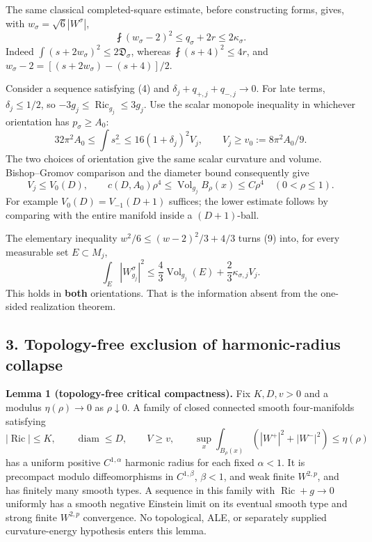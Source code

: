 \documentclass[
  11pt,
]{article}
\begin{document}
The same classical completed-square estimate, before constructing forms,
gives, with \(w_\sigma=\sqrt6|W^\sigma|\), \[
 \fint(w_\sigma-2)^2\le q_\sigma+2r\le2\kappa_\sigma.
 \tag{9}
\] Indeed \(\int(s+2w_\sigma)^2\le2\mathfrak D_\sigma\), whereas
\(\fint(s+4)^2\le4r\), and \(w_\sigma-2=[(s+2w_\sigma)-(s+4)]/2\).

Consider a sequence satisfying (4) and \(\delta_j+q_{+,j}+q_{-,j}\to0\).
For late terms, \(\delta_j\le1/2\), so
\(-3g_j\le\operatorname{Ric}_{g_j}\le3g_j\). Use the scalar monopole
inequality in whichever orientation has \(p_\sigma\ge A_0\): \[
 32\pi^2 A_0\le\int s_-^2
 \le16(1+\delta_j)^2V_j,
 \qquad V_j\ge v_0:=8\pi^2A_0/9.
 \tag{10}
\] The two choices of orientation give the same scalar curvature and
volume. Bishop--Gromov comparison and the diameter bound consequently
give \[
 V_j\le V_0(D),\qquad
 c(D,A_0)\rho^4\le\operatorname{Vol}_{g_j}B_\rho(x)
 \le C\rho^4\quad(0<\rho\le1).
 \tag{11}
\] For example \(V_0(D)=V_{-1}(D+1)\) suffices; the lower estimate
follows by comparing with the entire manifold inside a \((D+1)\)-ball.

The elementary inequality \(w^2/6\le (w-2)^2/3+4/3\) turns (9) into, for
every measurable set \(E\subset M_j\), \[
 \int_E|W^\sigma_{g_j}|^2
 \le\frac43\operatorname{Vol}_{g_j}(E)
       +\frac23\kappa_{\sigma,j}V_j.
 \tag{12}
\] This holds in \textbf{both} orientations. That is the information
absent from the one-sided realization theorem.

\hypertarget{topology-free-exclusion-of-harmonic-radius-collapse}{%
\subsection{3. Topology-free exclusion of harmonic-radius
collapse}\label{topology-free-exclusion-of-harmonic-radius-collapse}}

\textbf{Lemma 1 (topology-free critical compactness).} Fix \(K,D,v>0\)
and a modulus \(\eta(\rho)\to0\) as \(\rho\downarrow0\). A family of
closed connected smooth four-manifolds satisfying \[
 |\operatorname{Ric}|\le K,\qquad\operatorname{diam}\le D,
 \qquad V\ge v,\qquad
 \sup_x\int_{B_\rho(x)}(|W^+|^2+|W^-|^2)\le\eta(\rho)
 \tag{13a}
\] has a uniform positive \(C^{1,\alpha}\) harmonic radius for each
fixed \(\alpha<1\). It is precompact modulo diffeomorphisms in
\(C^{1,\beta}\), \(\beta<1\), and weak finite \(W^{2,p}\), and has
finitely many smooth types. A sequence in this family with
\(\operatorname{Ric}+g\to0\) uniformly has a smooth negative Einstein
limit on its eventual smooth type and strong finite \(W^{2,p}\)
convergence. No topological, ALE, or separately supplied
curvature-energy hypothesis enters this lemma.
\end{document}
